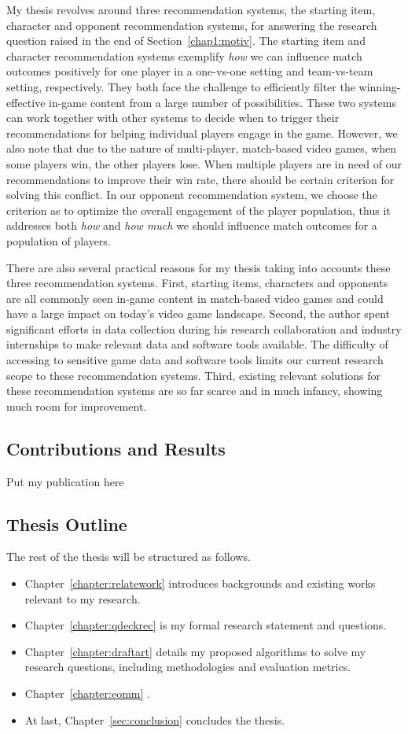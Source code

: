 My thesis revolves around three recommendation systems, the starting item, character and opponent recommendation systems, for answering the research question raised in the end of Section~\ref{chap1:motiv}. The starting item and character recommendation systems exemplify \textit{how} we can influence match outcomes positively for one player in a one-vs-one setting and team-vs-team setting, respectively. They both face the challenge to efficiently filter the winning-effective in-game content from a large number of possibilities. These two systems can work together with other systems to decide when to trigger their recommendations for helping individual players engage in the game. However, we also note that due to the nature of multi-player, match-based video games, when some players win, the other players lose. When multiple players are in need of our recommendations to improve their win rate, there should be certain criterion for solving this conflict. In our opponent recommendation system, we choose the criterion as to optimize the overall engagement of the player population, thus it addresses both \textit{how} and \textit{how much} we should influence match outcomes for a population of players. 

There are also several practical reasons for my thesis taking into accounts these three recommendation systems. First, starting items, characters and opponents are all commonly seen in-game content in match-based video games and could have a large impact on today's video game landscape.  Second, the author spent significant efforts in data collection during his research collaboration and industry internships to make relevant data and software tools available. The difficulty of accessing to sensitive game data and software tools limits our current research scope to these recommendation systems. Third, existing relevant solutions for these recommendation systems are so far scarce and in much infancy, showing much room for improvement. 

\subsection{Contributions and Results}
Put my publication here

\subsection{Thesis Outline}
The rest of the thesis will be structured as follows. 
\begin{itemize}
\item Chapter~\ref{chapter:relatework} introduces backgrounds and existing works relevant to my research. 
\item Chapter~\ref{chapter:qdeckrec} is my formal research statement and questions. 
\item Chapter~\ref{chapter:draftart} details my proposed algorithms to solve my research questions, including methodologies and evaluation metrics.
\item Chapter~\ref{chapter:eomm} .
\item At last, Chapter~\ref{sec:conclusion} concludes the thesis.
\end{itemize}

